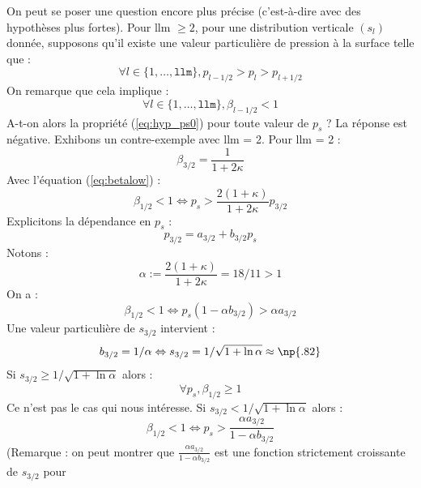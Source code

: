 \documentclass[a4paper,french]{article}
\begin{document}
On peut se poser une question encore plus précise (c'est-à-dire avec
des hypothèses plus fortes). Pour llm $\ge 2$, pour une distribution
verticale $(s_l)$ donnée, supposons qu'il existe une valeur
particulière de pression à la surface telle que :
\begin{equation}
  \label{eq:hyp_ps0}
  \forall l \in \{1, \dots, \mathtt{llm}\}, p_{l - 1 / 2} > p_l > p_{l + 1 / 2}
\end{equation}
On remarque que cela implique :
\begin{equation*}
  \forall l \in \{1, \dots, \mathtt{llm}\}, \beta_{l - 1 / 2} < 1  
\end{equation*}
A-t-on alors la propriété (\ref{eq:hyp_ps0}) pour toute valeur de
$p_s$ ? La réponse est négative. Exhibons un contre-exemple avec llm =
2. Pour llm = 2 :
\begin{equation*}
    \beta_{3/2} = \frac{1}{1 + 2 \kappa}
\end{equation*}
Avec l'équation (\ref{eq:betalow}) :
\begin{equation*}
  \beta_{1/2} < 1
  \Leftrightarrow p_s > \frac{2 (1 + \kappa)}{1 + 2 \kappa} p_{3/2}
\end{equation*}
Explicitons la dépendance en $p_s$ :
\begin{equation*}
  p_{3/2} = a_{3/2} + b_{3/2} p_s
\end{equation*}
Notons :
\begin{equation*}
  \alpha := \frac{2 (1 + \kappa)}{1 + 2 \kappa} = 18 / 11 > 1
\end{equation*}
On a :
\begin{equation*}
  \beta_{1/2} < 1
  \Leftrightarrow p_s (1 - \alpha b_{3/2}) > \alpha a_{3/2}
\end{equation*}
Une valeur particulière de $s_{3/2}$ intervient :
\begin{equation*}
  b_{3/2} = 1 / \alpha
  \Leftrightarrow s_{3/2} = 1 / \sqrt{1 + \ln \alpha} \approx \np{.82}
\end{equation*}
Si $s_{3/2} \ge 1 / \sqrt{1 + \ln \alpha}$ alors :
\begin{equation*}
  \forall p_s, \beta_{1/2} \ge 1
\end{equation*}
Ce n'est pas le cas qui nous intéresse. Si $s_{3/2} < 1 / \sqrt{1 +
  \ln \alpha}$ alors :
\begin{equation*}
  \beta_{1/2} < 1
  \Leftrightarrow p_s > \frac{\alpha a_{3/2}}{1 - \alpha b_{3/2}}
\end{equation*}
(Remarque : on peut montrer que $\frac{\alpha a_{3/2}}{1 - \alpha
  b_{3/2}}$ est une fonction strictement croissante de $s_{3/2}$ pour
\end{document}
